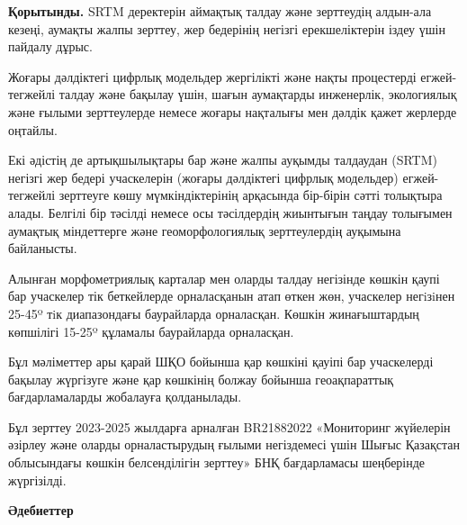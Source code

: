 \begin{multicols}{2}
{\bfseries Қорытынды.} SRTM деректерін аймақтық талдау және зерттеудің
алдын-ала кезеңі, аумақты жалпы зерттеу, жер бедерінің негізгі
ерекшеліктерін іздеу үшін пайдалу дұрыс.

Жоғары дәлдіктегі цифрлық модельдер жергілікті және нақты процестерді
егжей-тегжейлі талдау және бақылау үшін, шағын аумақтарды инженерлік,
экологиялық және ғылыми зерттеулерде немесе жоғары нақталығы мен дәлдік
қажет жерлерде оңтайлы.

Екі әдістің де артықшылықтары бар және жалпы ауқымды талдаудан (SRTM)
негізгі жер бедері учаскелерін (жоғары дәлдіктегі цифрлық модельдер)
егжей-тегжейлі зерттеуге көшу мүмкіндіктерінің арқасында бір-бірін сәтті
толықтыра алады. Белгілі бір тәсілді немесе осы тәсілдердің жиынтығын
таңдау толығымен аумақтық міндеттерге және геоморфологиялық
зерттеулердің ауқымына байланысты.

Алынған морфометриялық карталар мен оларды талдау негізінде көшкін қаупі
бар учаскелер тік беткейлерде орналасқанын атап өткен жөн, учаскелер
негiзiнен 25-45º тiк диапазондағы баурайларда орналасқан. Көшкін
жинағыштардың көпшілігі 15-25º құламалы баурайларда орналасқан.

Бұл мәліметтер ары қарай ШҚО бойынша қар көшкіні қауіпі бар учаскелерді
бақылау жүргізуге және қар көшкінің болжау бойынша геоақпараттық
бағдарламаларды жобалауға қолданылады.

Бұл зерттеу 2023-2025 жылдарға арналған BR21882022 «Мониторинг жүйелерін
әзірлеу және оларды орналастырудың ғылыми негіздемесі үшін Шығыс
Қазақстан облысындағы көшкін белсенділігін зерттеу» БНҚ бағдарламасы
шеңберінде жүргізілді.
\end{multicols}

\begin{center}
{\bfseries Әдебиеттер}
\end{center}

